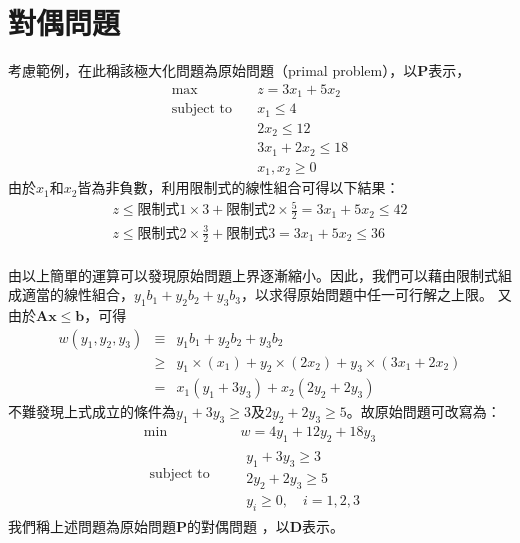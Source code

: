 \documentclass[12pt,a4paper,oneside]{report}
\begin{document}
\section{對偶問題}
 考慮範例，在此稱該極大化問題為原始問題（primal problem），以$\mathbf{P}$表示，
\begin{align*}
\max \quad & z=3x_1 + 5x_2 \\
\text{subject to} \quad & x_1 \leq 4  \\
                       & 2x_2 \leq 12  \\
                       & 3x_1 + 2x_2 \leq  18  \\
                       & x_1, x_2 \geq 0
\end{align*}
由於$x_1$和$x_2$皆為非負數，利用限制式的線性組合可得以下結果：
$$
\begin{array}{c}
z\le \text{限制式1}\times 3+\text{限制式2}\times \frac{5}{2}=3x_1+5x_2\leq 42\\
z\le \text{限制式2}\times \frac{3}{2} +\text{限制式3}=3x_1+5x_2\le 36\\
\end{array}
$$

由以上簡單的運算可以發現原始問題上界逐漸縮小。因此，我們可以藉由限制式組成適當的線性組合，$y_1 b_1 + y_2 b_2 + y_3 b_3$，以求得原始問題中任一可行解之上限。
又由於$\mathbf{Ax}\le\mathbf{b}$，可得
\begin{eqnarray*}
w(y_1,y_2,y_3) &\equiv& y_1 b_1 + y_2 b_2 + y_3 b_2\\
&\ge& y_1\times ( x_1 )+y_2 \times (2 {x_2})+y_3 \times (  3{x_1}+2{x_2}) \\
&=& x_1(y_1+3 y_3)+x_2(2y_2+2y_3)
\end{eqnarray*}
不難發現上式成立的條件為$y_1+3 y_3\geq 3$及$2y_2+2y_3\geq 5$。故原始問題可改寫為：
\begin{align*}
\min \quad & w = 4y_1 + 12y_2 + 18y_3  \\
\begin{array}{c}
\text{subject to}\\
\text{}\\
\text{}
\end{array} \quad &
\begin{array}{l}
y_1 + 3y_3 \geq 3  \\
2y_2 + 2y_3 \geq 5  \\
y_i \geq 0, \quad i = 1, 2, 3
\end{array}
\end{align*}
我們稱上述問題為原始問題$\mathbf{P}$的對偶問題 ，以$\mathbf{D}$表示。
\end{document}
